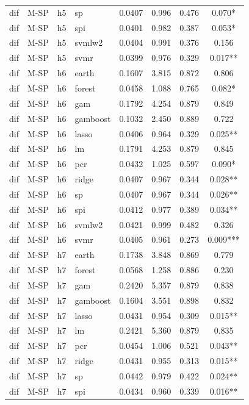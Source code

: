 \begin{ThreePartTable}
\begin{longtable}[t]{llclcccc}
dif & M-SP & h5 & sp & 0.0407 & 0.996 & 0.476 & 0.070*\\
dif & M-SP & h5 & spi & 0.0401 & 0.982 & 0.387 & 0.053*\\
dif & M-SP & h5 & svmlw2 & 0.0404 & 0.991 & 0.376 & 0.156\\
dif & M-SP & h5 & svmr & 0.0399 & 0.976 & 0.329 & 0.017**\\
\addlinespace
dif & M-SP & h6 & earth & 0.1607 & 3.815 & 0.872 & 0.806\\
dif & M-SP & h6 & forest & 0.0458 & 1.088 & 0.765 & 0.082*\\
dif & M-SP & h6 & gam & 0.1792 & 4.254 & 0.879 & 0.849\\
dif & M-SP & h6 & gamboost & 0.1032 & 2.450 & 0.889 & 0.722\\
dif & M-SP & h6 & lasso & 0.0406 & 0.964 & 0.329 & 0.025**\\
dif & M-SP & h6 & lm & 0.1791 & 4.253 & 0.879 & 0.845\\
dif & M-SP & h6 & pcr & 0.0432 & 1.025 & 0.597 & 0.090*\\
dif & M-SP & h6 & ridge & 0.0407 & 0.967 & 0.344 & 0.028**\\
dif & M-SP & h6 & sp & 0.0407 & 0.967 & 0.344 & 0.026**\\
dif & M-SP & h6 & spi & 0.0412 & 0.977 & 0.389 & 0.034**\\
dif & M-SP & h6 & svmlw2 & 0.0421 & 0.999 & 0.482 & 0.326\\
dif & M-SP & h6 & svmr & 0.0405 & 0.961 & 0.273 & 0.009***\\
\addlinespace
dif & M-SP & h7 & earth & 0.1738 & 3.848 & 0.869 & 0.779\\
dif & M-SP & h7 & forest & 0.0568 & 1.258 & 0.886 & 0.230\\
dif & M-SP & h7 & gam & 0.2420 & 5.357 & 0.879 & 0.838\\
dif & M-SP & h7 & gamboost & 0.1604 & 3.551 & 0.898 & 0.832\\
dif & M-SP & h7 & lasso & 0.0431 & 0.954 & 0.309 & 0.015**\\
dif & M-SP & h7 & lm & 0.2421 & 5.360 & 0.879 & 0.835\\
dif & M-SP & h7 & pcr & 0.0454 & 1.006 & 0.521 & 0.043**\\
dif & M-SP & h7 & ridge & 0.0431 & 0.955 & 0.313 & 0.015**\\
dif & M-SP & h7 & sp & 0.0442 & 0.979 & 0.422 & 0.024**\\
dif & M-SP & h7 & spi & 0.0434 & 0.960 & 0.339 & 0.016**\\

\end{longtable}
\end{ThreePartTable}
